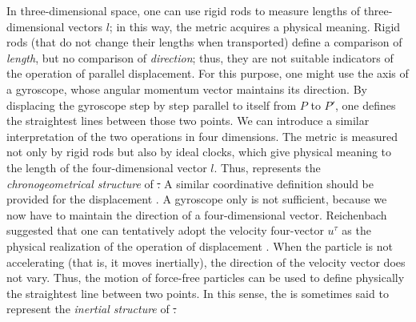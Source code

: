 \documentclass[submitted]{article}
\begin{document}
In three-dimensional space, one can use rigid rods to measure lengths of three-dimensional vectors $l$; in this way, the metric acquires a physical meaning. Rigid rods (that do not change their lengths when transported) define a comparison of \emph{length}, but no comparison of \emph{direction}; thus, they are not suitable indicators of the operation of parallel displacement. For this purpose, one might use the axis of a gyroscope, whose angular momentum vector maintains its direction. By displacing the gyroscope step by step parallel to itself from $P$ to $P'$, one defines the straightest lines between those two points. We can introduce a similar interpretation of the two operations in four dimensions. The metric \gmn is measured not only by rigid rods but also by ideal clocks, which give physical meaning to the length of the four-dimensional vector $l$. Thus, \gmn represents the \emph{chronogeometrical structure} of \st. A similar coordinative definition should be provided for the displacement \Gtmn. A gyroscope only is not sufficient, because we now have to maintain the direction of a four-dimensional vector. Reichenbach suggested that one can tentatively adopt the velocity four-vector $u^\tau$ as the physical realization of the operation of displacement \citep[]{Eddington1923}. When the particle is not accelerating (that is, it moves inertially), the direction of the velocity vector does not vary. Thus, the motion of force-free particles can be used to define physically the straightest line between two \spti points. In this sense, the \Gtmn is sometimes said to represent the \emph{inertial structure} of \st. 
\end{document}
